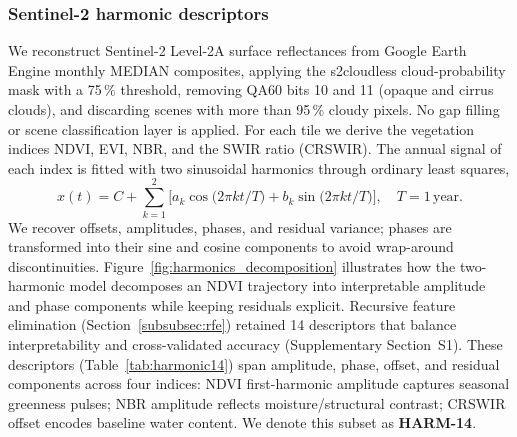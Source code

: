 \documentclass[utf8]{FrontiersinHarvard}
\begin{document}
\subsubsection{Sentinel-2 harmonic descriptors}
We reconstruct Sentinel-2 Level-2A surface reflectances from Google Earth Engine monthly MEDIAN composites, applying the s2cloudless cloud-probability mask with a 75\,\% threshold, removing QA60 bits 10 and 11 (opaque and cirrus clouds), and discarding scenes with more than 95\,\% cloudy pixels. No gap filling or scene classification layer is applied. For each tile we derive the vegetation indices NDVI, EVI, NBR, and the SWIR ratio (CRSWIR). The annual signal of each index is fitted with two sinusoidal harmonics through ordinary least squares,
\[
  x(t) = C + \sum_{k=1}^{2} \big[a_k \cos\!\big(2\pi k t/T\big) + b_k \sin\!\big(2\pi k t/T\big)\big], \quad T = 1\,\text{year}.
\]
We recover offsets, amplitudes, phases, and residual variance; phases are transformed into their sine and cosine components to avoid wrap-around discontinuities. Figure~\ref{fig:harmonics_decomposition} illustrates how the two-harmonic model decomposes an NDVI trajectory into interpretable amplitude and phase components while keeping residuals explicit. Recursive feature elimination (Section~\ref{subsubsec:rfe}) retained 14 descriptors that balance interpretability and cross-validated accuracy (Supplementary Section~S1). These descriptors (Table~\ref{tab:harmonic14}) span amplitude, phase, offset, and residual components across four indices: NDVI first-harmonic amplitude captures seasonal greenness pulses; NBR amplitude reflects moisture/structural contrast; CRSWIR offset encodes baseline water content. We denote this subset as \textbf{HARM-14}.
\end{document}
